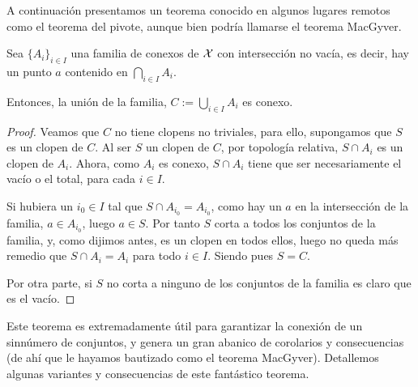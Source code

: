 A continuación presentamos un teorema conocido en algunos lugares remotos como el teorema del pivote, aunque bien podría llamarse el teorema MacGyver.
\begin{theo}
	\label{conex_theo_pivote}
	Sea $\{A_i\}_{i\in I}$ una familia de conexos de $\mathcal{X}$ con intersección no vacía, es decir, hay un punto $a$ contenido en $\bigcap_{i\in I} A_i$.
	
	Entonces, la unión de la familia, $C:=\bigcup_{i\in I} A_i$ es conexo.
\end{theo}
\begin{proof}
	Veamos que $C$ no tiene clopens no triviales, para ello, supongamos que $S$ es un clopen de $C$. Al ser $S$ un clopen de $C$, por topología relativa, $S\cap A_i$ es un clopen de $A_i$. Ahora, como $A_i$ es conexo, $S\cap A_i$ tiene que ser necesariamente el vacío o el total, para cada $i\in I$.
	
	Si hubiera un $i_0\in I$ tal que $S\cap A_{i_0}=A_{i_0}$, como hay un $a$ en la intersección de la familia, $a\in A_{i_0}$, luego $a\in S$. Por tanto $S$ corta a todos los conjuntos de la familia, y, como dijimos antes, es un clopen en todos ellos, luego no queda más remedio que $S\cap A_i=A_i$ para todo $i\in I$. Siendo pues $S=C$.
	
	Por otra parte, si $S$ no corta a ninguno de los conjuntos de la familia es claro que es el vacío. 
\end{proof}

Este teorema es extremadamente útil para garantizar la conexión de un sinnúmero de conjuntos, y genera un gran abanico de corolarios y consecuencias (de ahí que le hayamos bautizado como el teorema MacGyver). Detallemos algunas variantes y consecuencias de este fantástico teorema.

